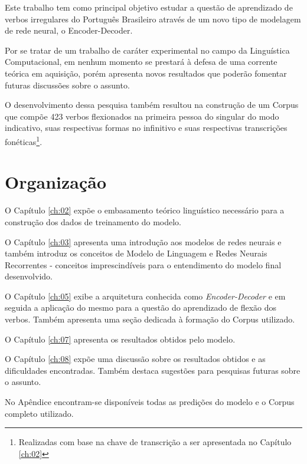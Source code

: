 Este trabalho tem como principal objetivo estudar a questão de aprendizado de verbos irregulares do Português Brasileiro através de um novo tipo de modelagem de rede neural, o Encoder-Decoder. 

Por se tratar de um trabalho de caráter experimental no campo da Linguística Computacional, em nenhum momento se prestará à defesa de uma corrente teórica em aquisição, porém apresenta novos resultados que poderão fomentar futuras discussões sobre o assunto. 

O desenvolvimento dessa pesquisa também resultou na construção de um Corpus que compõe 423 verbos flexionados na primeira pessoa do singular do modo indicativo, suas respectivas formas no infinitivo e suas respectivas transcrições fonéticas\footnote{Realizadas com base na chave de transcrição a ser apresentada no Capítulo \ref{ch:02}}.


\section{Organização}
\label{sec:organization}

O Capítulo \ref{ch:02} expõe o embasamento teórico linguístico necessário para a construção dos dados de treinamento do modelo. 

O Capítulo \ref{ch:03} apresenta uma introdução aos modelos de redes neurais e também introduz os conceitos de Modelo de Linguagem e Redes Neurais Recorrentes - conceitos imprescindíveis para o entendimento do modelo final desenvolvido.

O Capítulo \ref{ch:05} exibe a arquitetura conhecida como \textit{Encoder-Decoder} e em seguida a aplicação do mesmo para a questão do aprendizado de flexão dos verbos. Também apresenta uma seção dedicada à formação do Corpus utilizado.

O Capítulo \ref{ch:07} apresenta os resultados obtidos pelo modelo.

O Capítulo \ref{ch:08} expõe uma discussão sobre os resultados obtidos e as dificuldades encontradas. Também destaca sugestões para pesquisas futuras sobre o assunto.

No Apêndice encontram-se disponíveis todas as predições do modelo e o Corpus completo utilizado.

